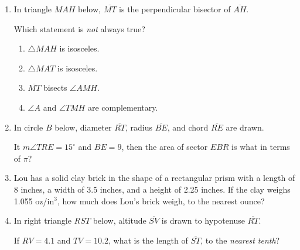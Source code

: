\documentclass[12pt, twoside]{article}
\begin{document}
\begin{enumerate}[itemsep=0.5cm]
\newpage
\item In triangle $MAH$ below, $\overline{MT}$ is the perpendicular bisector of $\overline{AH}$.
  \begin{center}
  \end{center}
Which statement is \emph{not} always true?
  \begin{enumerate}
    \item $\triangle MAH$ is isosceles.
    \item $\triangle MAT$ is isosceles.
    \item $\overline{MT}$ bisects $\angle AMH$.
    \item $\angle A$ and $\angle TMH$ are complementary.
  \end{enumerate}

\item In circle $B$ below, diameter $\overline{RT}$, radius $\overline{BE}$, and chord $\overline{RE}$ are drawn.
\begin{center}
  \end{center}
  It $m\angle TRE = 15^\circ$ and $BE=9$, then the area of sector $EBR$ is what in terms of $\pi$?

\item Lou has a solid clay brick in the shape of a rectangular prism with a length of 8 inches, a width of 3.5 inches, and a height of 2.25 inches. If the clay weighs 1.055 oz/in$^3$, how much does Lou's brick weigh, to the nearest ounce? 

\item In right triangle $RST$ below, altitude $\overline{SV}$ is drawn to hypotenuse $\overline{RT}$.
  \begin{center}
  \end{center}
If $RV=4.1$ and $TV=10.2$, what is the length of $\overline{ST}$, to the \emph{nearest tenth}?


\end{enumerate}
\end{document}
